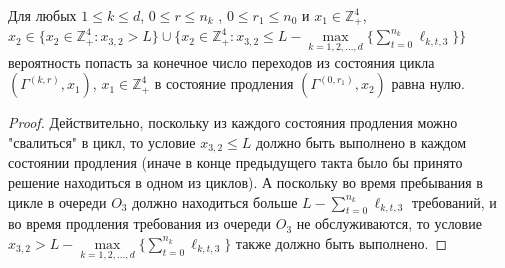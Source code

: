 \documentclass[a4paper,12pt,russian]{extarticle}
\newcommand{\ga}[1]{\Gamma^{\left( #1 \right)} }
\begin{document}
\begin{lemma}
Для любых $1 \leqslant k \leqslant d$, $0 \leqslant r \leqslant n_k$ , $0 \leqslant r_1 \leqslant n_0$ и $x_1 \in \mathbb{Z}_+^4$,  $x_2 \in \{x_2 \in \mathbb{Z}_+^4 \colon x_{3,2} > L \} \cup \{x_2 \in \mathbb{Z}_+^4 \colon x_{3,2} \leqslant L -  \max\limits_{k=1, 2, \ldots, d}\{\sum_{t=0}^{n_k} \ell_{k,t,3}\} \} $ вероятность попасть за конечное число переходов из состояния цикла  $(\ga{k,r},x_1)$, $x_1 \in \mathbb{Z}_+^4$ в состояние продления $(\ga{0,r_1},x_2)$ равна нулю.
\label{lemma:8}
\end{lemma}
\begin{proof}
Действительно, поскольку из каждого состояния продления можно "свалиться" в цикл, то условие $x_{3,2} \leqslant L$ должно быть выполнено в каждом состоянии продления (иначе в конце предыдущего такта было бы принято решение находиться в одном из циклов). А поскольку во время пребывания в цикле в очереди $O_3$ должно находиться больше $L -  \sum_{t=0}^{n_k} \ell_{k,t,3}$ требований, и во время продления требования из очереди $O_3$ не обслуживаются, то условие $x_{3,2} > L -  \max\limits_{k=1, 2, \ldots, d}\{\sum_{t=0}^{n_k} \ell_{k,t,3}\}$ также должно быть выполнено.
\end{proof}
\end{document}
